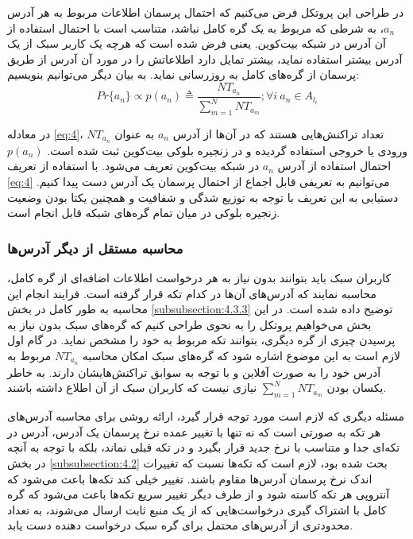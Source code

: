 در طراحی این پروتکل فرض می‌کنیم که احتمال پرسمان اطلاعات مربوط به هر آدرس $a_n$، به شرطی که مربوط به یک گره کامل نباشد، متناسب است با احتمال استفاده از آن آدرس در شبکه بیت‌کوین. یعنی فرض شده است که هرچه یک کاربر سبک از یک آدرس بیشتر استفاده نماید،‌ بیشتر تمایل دارد اطلاعاتش را در مورد آن آدرس از طریق پرسمان از گره‌های کامل به روزرسانی نماید. به بیان دیگر می‌توانیم بنویسیم:
\begin{equation}
Pr\{{a_n}\} \propto p(a_n) \triangleq \frac{NT_{a_n}}{\sum_{m=1}^{N}NT_{a_m}}; \forall i \  a_n \in A_{l_i}  \label{eq:4}
\end{equation}

در معادله \eqref{eq:4}، 
$NT_{a_n}$
تعداد تراکنش‌هایی هستند که در آن‌ها از آدرس $a_n$ به عنوان ورودی یا خروجی استفاده گردیده و در زنجیره بلوکی بیت‌کوین ثبت شده است. $p(a_n)$ احتمال استفاده از آدرس $a_n$ در شبکه بیت‌کوین تعریف می‌شود. با استفاده از تعریف  \eqref{eq:4} می‌توانیم به تعریفی قابل اجماع از احتمال پرسمان یک آدرس دست پیدا کنیم. دستیابی به این تعریف با توجه به توزیع شدگی و شفافیت و همچنین یکتا بودن وضعیت زنجیره بلوکی در میان تمام گره‌های شبکه قابل انجام است.  

\subsubsection{محاسبه مستقل از دیگر آدرس‌ها}
\label{subsubsection:4.3.1}
کاربران سبک  باید بتوانند بدون نیاز به هر درخواست اطلاعات اضافه‌ای از گره کامل، محاسبه نمایند که آدرس‌های آن‌ها در کدام تکه قرار گرفته است. فرایند انجام این محاسبه به طور کامل در بخش \ref{subsubsection:4.3.3} توضیح داده شده است. در این بخش می‌خواهیم پروتکل را به نحوی طراحی کنیم که گره‌های سبک بدون نیاز به پرسیدن چیزی از گره دیگری، بتوانند تکه مربوط به خود را مشخص نماید. در گام اول لازم است به این موضوع اشاره شود که گره‌های سبک امکان محاسبه $NT_{a_n}$ مربوط به آدرس خود را به صورت آفلاین و با توجه به سوابق تراکنش‌هایشان دارند. به خاطر یکسان بودن
$\sum_{m=1}^{N}NT_{a_m}$
نیازی نیست که کاربران سبک از آن اطلاع داشته باشند.

مسئله دیگری که لازم است مورد توجه قرار گیرد، ارائه روشی برای محاسبه آدرس‌های هر تکه به صورتی است که نه تنها با تغییر عمده نرخ پرسمان یک آدرس، آدرس در تکه‌ای جدا و متناسب با نرخ جدید قرار بگیرد و در تکه قبلی نماند، بلکه با توجه به آنچه در بخش \ref{subsubsection:4.2} بحث شده بود، لازم است که تکه‌ها نسبت که تغییرات اندک نرخ پرسمان آدرس‌ها مقاوم باشند. تغییر خیلی کند تکه‌ها باعث می‌شود که آنتروپی هر تکه کاسته شود و از طرف دیگر تغییر سریع تکه‌ها باعث می‌شود که گره کامل با اشتراک گیری درخواست‌هایی که از یک منبع ثابت ارسال می‌شوند، به تعداد محدودتری از آدرس‌های محتمل برای گره سبک درخواست دهنده دست یابد.

